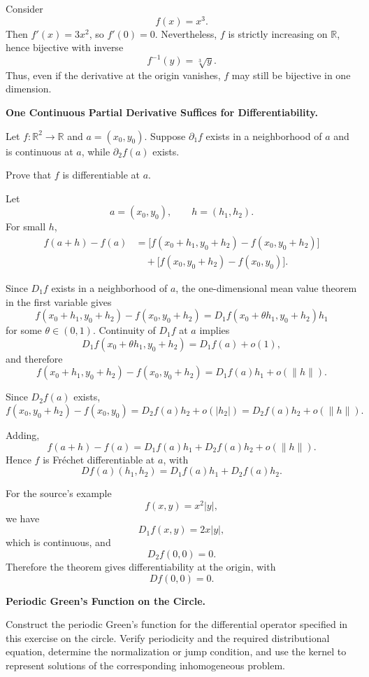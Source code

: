 \begin{solution}
Consider
		\[
		f(x)=x^3.
		\]
		Then $f'(x)=3x^2$, so $f'(0)=0$.
		Nevertheless, $f$ is strictly increasing on $\mathbb{R}$, hence bijective with inverse
		\[
		f^{-1}(y)=\sqrt[3]{y}.
		\]
		Thus, even if the derivative at the origin vanishes, $f$ may still be bijective in one dimension.
\end{solution}

\begin{problem}[CP-II-0473]
\label{prob:cp-ii-0473}
\textbf{One Continuous Partial Derivative Suffices for Differentiability.}

\hspace*{1.5em}Let \(f:\mathbb R^2\to\mathbb R\) and \(a=(x_0,y_0)\). Suppose
\(\partial_1f\) exists in a neighborhood of \(a\) and is continuous at \(a\),
while \(\partial_2f(a)\) exists.

Prove that \(f\) is differentiable at \(a\).
\end{problem}

\begin{solution}
Let
\[
a=(x_0,y_0),
\qquad
h=(h_1,h_2).
\]
For small \(h\),
\[
\begin{aligned}
f(a+h)-f(a)
&=
\bigl[
f(x_0+h_1,y_0+h_2)-f(x_0,y_0+h_2)
\bigr]\\
&\quad+
\bigl[
f(x_0,y_0+h_2)-f(x_0,y_0)
\bigr].
\end{aligned}
\]

Since \(D_1f\) exists in a neighborhood of \(a\), the one-dimensional mean value theorem in
the first variable gives
\[
f(x_0+h_1,y_0+h_2)-f(x_0,y_0+h_2)
=
D_1f(x_0+\theta h_1,y_0+h_2)h_1
\]
for some \(\theta\in(0,1)\). Continuity of \(D_1f\) at \(a\) implies
\[
D_1f(x_0+\theta h_1,y_0+h_2)
=
D_1f(a)+o(1),
\]
and therefore
\[
f(x_0+h_1,y_0+h_2)-f(x_0,y_0+h_2)
=
D_1f(a)h_1+o(\|h\|).
\]

Since \(D_2f(a)\) exists,
\[
f(x_0,y_0+h_2)-f(x_0,y_0)
=
D_2f(a)h_2+o(|h_2|)
=
D_2f(a)h_2+o(\|h\|).
\]

Adding,
\[
f(a+h)-f(a)
=
D_1f(a)h_1+D_2f(a)h_2+o(\|h\|).
\]
Hence \(f\) is Fréchet differentiable at \(a\), with
\[
\boxed{
Df(a)(h_1,h_2)
=
D_1f(a)h_1+D_2f(a)h_2.
}
\]

For the source's example
\[
f(x,y)=x^2|y|,
\]
we have
\[
D_1f(x,y)=2x|y|,
\]
which is continuous, and
\[
D_2f(0,0)=0.
\]
Therefore the theorem gives differentiability at the origin, with
\[
Df(0,0)=0.
\]
\end{solution}


\begin{problem}[CP-II-0477]
\label{prob:cp-ii-0477}
\textbf{Periodic Green's Function on the Circle.}

\hspace*{1.5em}Construct the periodic Green's function for the differential operator
specified in this exercise on the circle. Verify periodicity and the required
distributional equation, determine the normalization or jump condition, and
use the kernel to represent solutions of the corresponding inhomogeneous
problem.
\end{problem}


